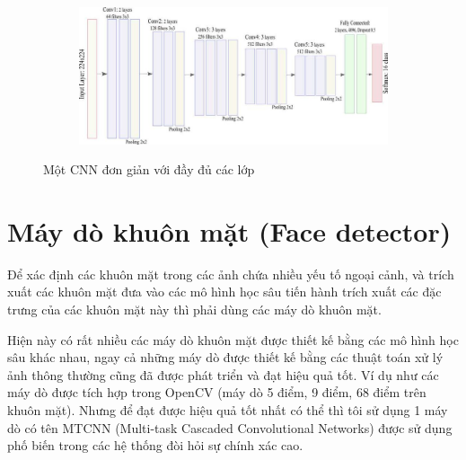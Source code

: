 \begin{figure}
    \begin{subfigure}{1.\textwidth}
        \begin{center}
            \includegraphics[width=1.\linewidth]{Chapters/items/chap2_8.jpg}
        \end{center}
        \label{fig: chap2_8}
    \end{subfigure}
    \caption{Một CNN đơn giản với đầy đủ các lớp}
\end{figure}

\newpage
\section{Máy dò khuôn mặt (Face detector)}

Để xác định các khuôn mặt\cite{detectface} trong các ảnh chứa nhiều yếu tố ngoại cảnh, và trích xuất các khuôn mặt đưa vào các
mô hình học sâu tiến hành trích xuất các đặc trưng của các khuôn mặt này thì phải dùng các máy dò khuôn mặt.

Hiện này có rất nhiều các máy dò khuôn mặt\cite{detectface1} được thiết kế bằng các mô hình học sâu khác nhau, ngay cả những máy dò được
thiết kế bằng các thuật toán xử lý ảnh thông thường cũng đã được phát triển và đạt hiệu quả tốt.
Ví dụ như các máy dò được tích hợp trong OpenCV (máy dò 5 điểm, 9 điểm, 68 điểm trên khuôn mặt). Nhưng để đạt được hiệu quả
tốt nhất có thể thì tôi sử dụng 1 máy dò có tên MTCNN (Multi-task Cascaded Convolutional Networks) được sử dụng phố biến
trong các hệ thống đòi hỏi sự chính xác cao.

